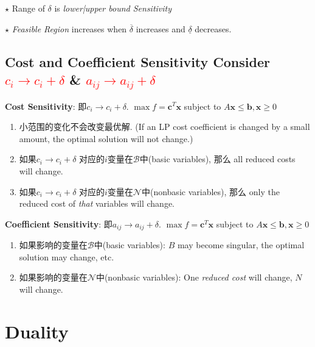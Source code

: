 \documentclass[9pt]{article}
\begin{document}
\qquad $\star$ Range of $\delta$ is \textit{lower|upper bound Sensitivity}

\qquad $\star$ \textit{Feasible Region} increases when $\overline{\delta}$ increases and $\underline{\delta}$ decreases.


\subsection{Cost and Coefficient Sensitivity {\scriptsize Consider \textcolor{red}{$c_i\to c_i+\delta$} \& \textcolor{red}{$a_{ij}\to a_{ij}+\delta$}}}

\textbf{Cost Sensitivity}: 即$c_i\to c_i+\delta$. \quad $\max f=\mathbf{c}^T\mathbf{x}$ subject to $A\mathbf{x}\leq \mathbf{b},\mathbf{x}\geq0$

\begin{enumerate}[itemsep=-2pt, topsep=-2pt]
    \item 小范围的变化不会改变最优解. {\scriptsize (If an LP cost coefficient is changed by a small amount, the optimal solution will not change.)}
    \item 如果$c_i\to c_i+\delta$ 对应的$i$变量在$\mathcal{B}$中(basic variables), 那么 all reduced costs will change.
    \item 如果$c_i\to c_i+\delta$ 对应的$i$变量在$\mathcal{N}$中(nonbasic variables), 那么 only the reduced cost of \textit{that} variables will change.
\end{enumerate}

\textbf{Coefficient Sensitivity}: 即$a_{ij}\to a_{ij}+\delta$. \quad $\max f=\mathbf{c}^T\mathbf{x}$ subject to $A\mathbf{x}\leq \mathbf{b},\mathbf{x}\geq0$

\begin{enumerate}[itemsep=-2pt, topsep=-2pt]
    \item 如果影响的变量在$\mathcal{B}$中(basic variables): $B$ may become singular, the optimal solution may change, etc.
    \item 如果影响的变量在$\mathcal{N}$中(nonbasic variables): One \textit{reduced cost} will change, $N$ will change.
\end{enumerate}


\section{Duality} %
\end{document}
